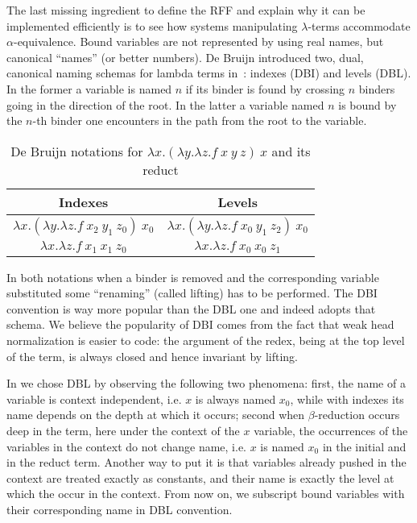 \documentclass{llncs}
\begin{document}
The last missing ingredient to define the RFF and explain why it can be
implemented efficiently is to see how systems manipulating $\lambda$-terms
accommodate
$\alpha$-equivalence.  Bound variables are not represented by using
real names, but canonical ``names'' (or better numbers).  De Bruijn introduced
two, dual, canonical naming schemas for lambda terms in~\cite{debruijnlevel}:
indexes (DBI) and levels
(DBL).  In the former a variable is named $n$ if its binder is found by
crossing $n$ binders going in the direction of the root.  In the latter a
variable named $n$ is bound by the $n$-th binder one encounters in the path
from the root to the variable.

\begin{table}
\begin{center}
\begin{tabular}{c@{~~}|@{~~}c}
	Indexes & Levels\\\hline
$\lambda x.(\lambda y.\lambda z.f~x_2~y_1~z_0)~x_0$ &
$\lambda x.(\lambda y.\lambda z.f~x_0~y_1~z_2)~x_0$ \\
$\lambda x.\lambda z.f~x_1~x_1~z_0$ &
$\lambda x.\lambda z.f~x_0~x_0~z_1$ \\
\end{tabular}
\end{center}
\caption{\label{example2}
De Bruijn notations for
$\lambda x.(\lambda y.\lambda z.f~x~y~z)~x$
and its reduct}
\end{table}

In both notations when a binder is removed and the corresponding variable
substituted some ``renaming'' (called lifting) has to be performed.  
The DBI convention is way more popular than the DBL one and \tedius{}
indeed adopts that schema.  We believe the popularity of DBI comes from the
fact that weak head normalization is easier to code: the argument of the
redex, being at the top level of the term, is always closed and hence
invariant by lifting.

In \elpi{} we chose DBL by observing the following two phenomena:
first, the name of a variable is context independent, i.e. $x$ is
always named $x_0$, while with indexes its name depends on the depth at
which it occurs; second
when $\beta$-reduction occurs deep in the term, here under the context
of the $x$ variable, the occurrences of the variables in the context do
not change name, i.e. $x$ is named $x_0$ in the initial and in the reduct
term.  Another way to put it is that variables already pushed in the context
are treated exactly as constants, and their name is exactly the level at
which the occur in the context.  From now on, we subscript bound variables
with their corresponding name in DBL convention.
\end{document}

